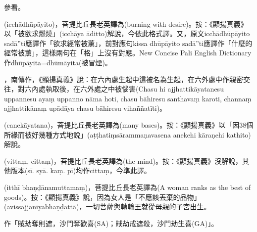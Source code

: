 \startitemgroup[noteitems]
\item{}參看。
\stopitemgroup

\startitemgroup[noteitems]
\item{}(icchādhūpāyito)，菩提比丘長老英譯為(burning with desire)。按：《顯揚真義》以「被欲求燃燒」(icchāya āditto)解說，今依此格式譯。又，原文icchādhūpāyito sadā”ti應譯作「欲求經常被薰」，前對應句kissa dhūpāyito sadā”ti應譯作「什麼的經常被薰」，這樣兩句在「格」上沒有對應。New Concise Pali English Dictionary作dhūpāyita=dhūmāyita(被冒煙)。
\stopitemgroup

\startitemgroup[noteitems]
\item{}，南傳作，《顯揚真義》說：在六內處生起中這被名為生起，在六外處中作親密交往，對六內處執取後，在六外處之中被惱害(Chasu hi ajjhattikāyatanesu uppannesu ayaṃ uppanno nāma hoti, chasu bāhiresu santhavaṃ karoti, channaṃ ajjhattikānaṃ upādāya chasu bāhiresu vihaññatīti)。
\stopitemgroup

\startitemgroup[noteitems]
\item{}(canekāyatana)，菩提比丘長老英譯為(many bases)。按：《顯揚真義》以「因38個所緣而被好幾種方式地說」(aṭṭhatiṃsārammaṇavasena anekehi kāraṇehi kathito)解說。
\stopitemgroup

\startitemgroup[noteitems]
\item{}(vittaṃ, cittaṃ)，菩提比丘長老英譯為(the mind)。按：《顯揚真義》沒解說，其他版本(sī. syā. kaṃ. pī)均作cittaṃ，今準此譯。
\stopitemgroup

\startitemgroup[noteitems]
\item{}(itthī bhaṇḍānamuttamaṃ)，菩提比丘長老英譯為(A woman ranks as the best of goods)。按：《顯揚真義》說，因為女人是「不應該丟棄的品物」(avissajjanīyabhaṇḍattā)，一切菩薩與轉輪王就從母親的子宮出生。
\stopitemgroup

\startitemgroup[noteitems]
\item{}作「賊劫奪則遮，沙門奪歡喜(SA)；賊劫戒遮殺，沙門劫生喜(GA)」。
\stopitemgroup

